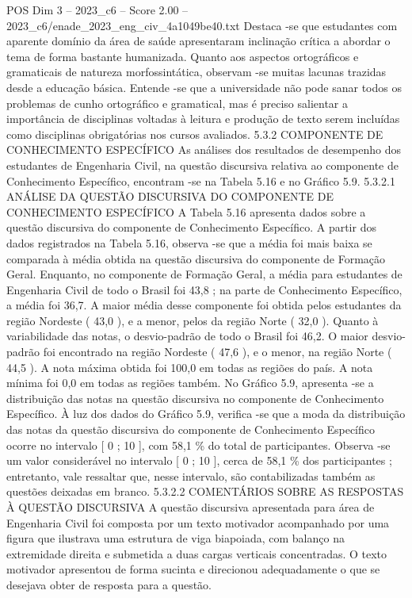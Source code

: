\begin{textsample}{POS Dim 3 – 2023\_c6 – Score 2.00 – 2023\_c6/enade\_2023\_eng\_civ\_4a1049be40.txt}
Destaca -se que estudantes com aparente domínio da área de saúde apresentaram inclinação crítica a abordar o tema de forma bastante humanizada.
Quanto aos aspectos ortográficos e gramaticais de natureza morfossintática, observam -se muitas lacunas trazidas desde a educação básica.
Entende -se que a universidade não pode sanar todos os problemas de cunho ortográfico e gramatical, mas é preciso salientar a importância de disciplinas voltadas à leitura e produção de texto serem incluídas como disciplinas obrigatórias nos cursos avaliados. 5.3.2 COMPONENTE DE CONHECIMENTO ESPECÍFICO As análises dos resultados de desempenho dos estudantes de Engenharia Civil, na questão discursiva relativa ao componente de Conhecimento Específico, encontram -se na Tabela 5.16 e no Gráfico 5.9. 5.3.2.1 ANÁLISE DA QUESTÃO DISCURSIVA DO COMPONENTE DE CONHECIMENTO ESPECÍFICO A Tabela 5.16 apresenta dados sobre a questão discursiva do componente de Conhecimento Específico.
A partir dos dados registrados na Tabela 5.16, observa -se que a média foi mais baixa se comparada à média obtida na questão discursiva do componente de Formação Geral.
Enquanto, no componente de Formação Geral, a média para estudantes de Engenharia Civil de todo o Brasil foi 43,8 ; na parte de Conhecimento Específico, a média foi 36,7.
A maior média desse componente foi obtida pelos estudantes da região Nordeste ( 43,0 ), e a menor, pelos da região Norte ( 32,0 ).
Quanto à variabilidade das notas, o desvio-padrão de todo o Brasil foi 46,2.
O maior desvio-padrão foi encontrado na região Nordeste ( 47,6 ), e o menor, na região Norte ( 44,5 ).
A nota máxima obtida foi 100,0 em todas as regiões do país.
A nota mínima foi 0,0 em todas as regiões também.
No Gráfico 5.9, apresenta -se a distribuição das notas na questão discursiva no componente de Conhecimento Específico.
À luz dos dados do Gráfico 5.9, verifica -se que a moda da distribuição das notas da questão discursiva do componente de Conhecimento Específico ocorre no intervalo [ 0 ; 10 ], com 58,1 \% do total de participantes.
Observa -se um valor considerável no intervalo [ 0 ; 10 ], cerca de 58,1 \% dos participantes ; entretanto, vale ressaltar que, nesse intervalo, são contabilizadas também as questões deixadas em branco. 5.3.2.2 COMENTÁRIOS SOBRE AS RESPOSTAS À QUESTÃO DISCURSIVA A questão discursiva apresentada para área de Engenharia Civil foi composta por um texto motivador acompanhado por uma figura que ilustrava uma estrutura de viga biapoiada, com balanço na extremidade direita e submetida a duas cargas verticais concentradas.
O texto motivador apresentou de forma sucinta e direcionou adequadamente o que se desejava obter de resposta para a questão.

\end{textsample}
